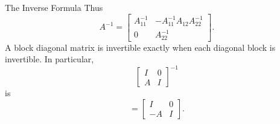 \begin{frame}{The Inverse Formula}
Thus
\[
\boxed{
A^{-1}=\begin{bmatrix}
A_{11}^{-1}&-A_{11}^{-1}A_{12}A_{22}^{-1}\\
0&A_{22}^{-1}
\end{bmatrix}}.
\]
\pause
A block diagonal matrix is invertible exactly when each diagonal block is invertible. In particular,
\[
\begin{bmatrix}I&0\\A&I\end{bmatrix}^{-1}
\] is\pause
\[
=\begin{bmatrix}I&0\\-A&I\end{bmatrix}.
\]
\end{frame}
